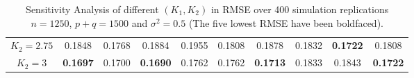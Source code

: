 \begin{table}[H]
{\begin{tabular}{|c|ccccccccc|}
$K_2 = 2.75$   &          0.1848        &              0.1768        &             0.1884        &              0.1955        &           0.1808        &              0.1878        &             0.1832&            \textbf{0.1722}&         0.1808        \\
$K_2 = 3$      &          \textbf{0.1697}&              0.1700        &             \textbf{0.1690}&              0.1762        &           0.1762        &              \textbf{0.1713}&             0.1833        &            0.1843        &         \textbf{0.1722}\\ \hline
\end{tabular}%
}
\caption{Sensitivity Analysis of different $(K_1, K_2)$ in RMSE over 400 simulation replications $n = 1250$, $p+q = 1500$ and $\sigma^2 = 0.5$ (The five lowest RMSE have been boldfaced).}
\label{tab:sen4}
\end{table}

